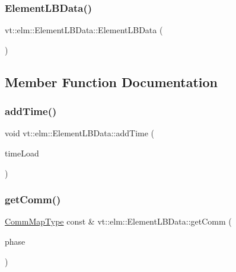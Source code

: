 \subsubsection{\texorpdfstring{Element\+L\+B\+Data()}{ElementLBData()}\hspace{0.1cm}{\footnotesize\ttfamily [3/3]}}
{\footnotesize\ttfamily vt\+::elm\+::\+Element\+L\+B\+Data\+::\+Element\+L\+B\+Data (\begin{DoxyParamCaption}\item[{\hyperlink{structvt_1_1elm_1_1_element_l_b_data}{Element\+L\+B\+Data} \&\&}]{ }\end{DoxyParamCaption})\hspace{0.3cm}{\ttfamily [default]}}



\subsection{Member Function Documentation}
\mbox{\label{structvt_1_1elm_1_1_element_l_b_data_ada678fdc6f4b80c29bbe0f1c973a13e3}} 
\subsubsection{\texorpdfstring{add\+Time()}{addTime()}}
{\footnotesize\ttfamily void vt\+::elm\+::\+Element\+L\+B\+Data\+::add\+Time (\begin{DoxyParamCaption}\item[{\hyperlink{namespacevt_a8fb51741340b87d7aaee0bef60e9896b}{Load\+Type} const}]{time\+Load }\end{DoxyParamCaption})}

\mbox{\label{structvt_1_1elm_1_1_element_l_b_data_a9a59e8546283b731702d07f2360d527d}} 
\subsubsection{\texorpdfstring{get\+Comm()}{getComm()}}
{\footnotesize\ttfamily \hyperlink{namespacevt_1_1elm_a38487cb8896b9b4763efa9022fab560e}{Comm\+Map\+Type} const  \& vt\+::elm\+::\+Element\+L\+B\+Data\+::get\+Comm (\begin{DoxyParamCaption}\item[{\hyperlink{namespacevt_a46ce6733d5cdbd735d561b7b4029f6d7}{Phase\+Type} const \&}]{phase }\end{DoxyParamCaption})}

